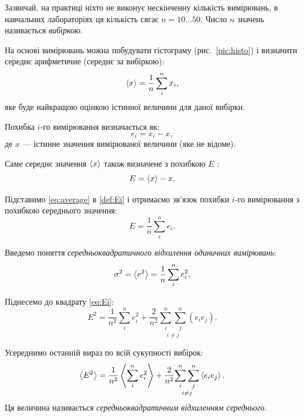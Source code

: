 \documentclass{LabBook}
\begin{document}
Зазвичай, на практиці ніхто не виконує нескінченну кількість вимірювань, в навчальних лабораторіях ця кількість сягає $n = 10 \ldots 50$. Число $n$ значень називається \emph{вибіркою}.

На основі вимірювань можна побудувати гістограму (рис.~\ref{pic:histo}) і визначити середнє арифметичне (середнє за вибіркою):
\begin{equation}\label{eq:average}
	\left\langle x \right\rangle = \frac1n \sum\limits_i^n x_i,
\end{equation}
яке буде найкращою оцінкою істинної величини для даної вибірки.

Похибка $i$-го вимірювання визначається як:
\begin{equation}\label{def:ei}
	e_i = x_i - x,
\end{equation}
де $x$ --- істинне значення вимірюваної величини (яке не відоме).

Саме середнє значення $\left\langle x \right\rangle$ також визначене з похибкою $E$ :
\begin{equation}\label{def:Ei}
	E = \left\langle x \right\rangle - x.
\end{equation}

Підставимо \eqref{eq:average} в \eqref{def:Ei} і отримаємо зв'язок похибки $i$-го вимірювання з похибкою середнього значення:
\begin{equation}\label{eq:Ei}
	E = \frac1n \sum\limits_i^n e_i.
\end{equation}


Введемо поняття \emph{середньоквадратичного відхилення одиничних вимірювань}:
\begin{equation}
	\sigma^2 = \left\langle e^2 \right\rangle  = \frac1n \sum_i^n e_i^2  , \label{def:sigma}
\end{equation}

Піднесемо до квадрату \eqref{eq:Ei}:
\begin{equation*}
	E^2 = \frac1{n^2} \sum_i^n e_i^2 + \frac2{n^2} \underset{i \neq j}{\sum_{i}^n \sum_{j}^n} (e_i e_j).
\end{equation*}

Усереднимо останній вираз по всій сукупності вибірок:
\begin{equation*}
	\left\langle E^2 \right\rangle = \frac1{n^2} \left\langle \sum_i^n e_i^2 \right\rangle + \frac2{n^2} \underset{i \neq j}{\sum_{i}^n \sum_{j}^n} \left\langle e_i e_j \right\rangle.
\end{equation*}
Ця величина називається \emph{середньоквадратичним відхиленням середнього}.
\end{document}
